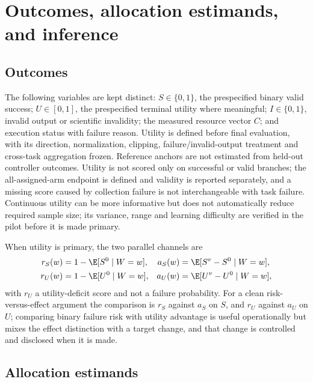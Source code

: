 \section{Outcomes, allocation estimands, and inference}
\label{sec:b-statistics}

\subsection{Outcomes}

The following variables are kept distinct: $S\in\{0,1\}$, the prespecified
binary valid success; $U\in[0,1]$, the prespecified terminal utility where
meaningful; $I\in\{0,1\}$, invalid output or scientific invalidity; the measured
resource vector $C$; and execution status with failure reason.  Utility is
defined before final evaluation, with its direction, normalization, clipping,
failure/invalid-output treatment and cross-task aggregation frozen.  Reference
anchors are not estimated from held-out controller outcomes.  Utility is not
scored only on successful or valid branches; the all-assigned-arm endpoint is
defined and validity is reported separately, and a missing score caused by
collection failure is not interchangeable with task failure.  Continuous
utility can be more informative but does not automatically reduce required
sample size; its variance, range and learning difficulty are verified in the
pilot before it is made primary.

When utility is primary, the two parallel channels are
\begin{equation}
 \begin{aligned}
 r_S(w)&=1-\E[S^0\mid W=w], & a_S(w)&=\E[S^v-S^0\mid W=w],\\
 r_U(w)&=1-\E[U^0\mid W=w], & a_U(w)&=\E[U^v-U^0\mid W=w],
 \end{aligned}
 \label{eq:b-channels}
\end{equation}
with $r_U$ a utility-deficit score and not a failure probability.  For a clean
risk-versus-effect argument the comparison is $r_S$ against $a_S$ on $S$, and
$r_U$ against $a_U$ on $U$; comparing binary failure risk with utility advantage
is useful operationally but mixes the effect distinction with a target change,
and that change is controlled and disclosed when it is made.

\subsection{Allocation estimands}

